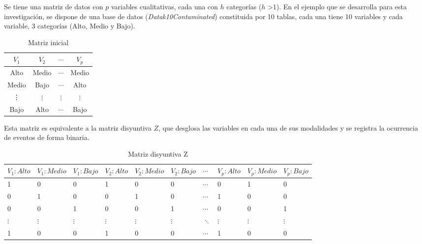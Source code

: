 \documentclass[water,article,submit,moreauthors,pdftex]{mdpi}
\begin{document}
Se tiene una matriz de datos con \(p\) variables cualitativas, cada una
con \(h\) categorías (\(h\) \textgreater1). En el ejemplo que se
desarrolla para esta investigación, se dispone de una base de datos
(\emph{Datak10Contaminated}) constituida por 10 tablas, cada una tiene
10 variables y cada variable, 3 categorías (Alto, Medio y Bajo).

\begin{table}[!ht]
\begin{center}
 \begin{tabular}{||c c c c||} 
 \hline
 $V_{1}$ & $V_{2}$ & $\cdots$ & $V_{p}$ \\ [0.5ex] 
 \hline\hline
 Alto & Medio & $\cdots$ & Medio\\
 \hline
Medio & Bajo & $\cdots$ & Alto\\
\hline
\vdots & $\vdots$ & $\vdots$ & $\vdots$\\
\hline
Bajo & Alto & $\cdots$ & Bajo \\ [1ex] 
 \hline
\end{tabular}\caption{Matriz inicial}
\label{tab:inicial}
\end{center}
\end{table}

Esta matriz es equivalente a la matriz disyuntiva \(Z\), que desglosa
las variables en cada una de sus modalidades y se registra la ocurrencia
de eventos de forma binaria.

\begin{table}[!ht]
\begin{center}
 \begin{tabular}{||p{1cm}p{1cm}p{1cm}||p{1cm}p{1cm} p{1cm} ||p{1cm} ||p{1cm} p{1cm} p{1cm} ||} 
 \hline
 $V_{1}:Alto$ &$V_{1}:Medio$ &$V_{1}:Bajo$ & $V_{2}:Alto$ & $V_{2}:Medio$ & $V_{2}:Bajo$ & $\cdots$ & $V_{p}:Alto$ & $V_{p}:Medio$ & $V_{p}:Bajo$ \\ [0.5ex] 
 \hline\hline
 1 & 0 & 0 & 1 & 0 & 0 & $\cdots$ & 0 & 1 & 0 \\ [0.2ex] 
 \hline
 0 & 1 & 0 & 0 & 1 & 0 & $\cdots$ & 1 & 0 & 0 \\ 
\hline
 0 & 0 & 1 & 0 & 0 &  1 & $\cdots$ & 0 & 0 & 1 \\ 
\hline
 $\vdots$ & $\vdots$ & $\vdots$ & $\vdots$ & $\vdots$ &  $\vdots$ & $\ddots$ & $\vdots$ & $\vdots$ & $\vdots$ \\ 
\hline
 1 & 0 & 0 & 1 & 0 & 0 & $\cdots$ &1 & 0 & 0 \\  
 \hline
\end{tabular}
\caption{Matriz disyuntiva Z}
\label{tab:z}
\end{center}
\end{table}
\end{document}
